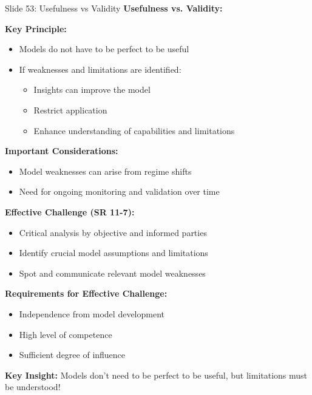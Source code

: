 \documentclass[8pt]{beamer}
\begin{document}
	\begin{frame}{Slide 53: Usefulness vs Validity}
		\fontsize{6.5}{7.5}\selectfont
		\textbf{Usefulness vs. Validity:}
		
		\vspace{0.1cm}
		\textbf{Key Principle:}
		\begin{itemize}
			\item Models do not have to be perfect to be useful
			\item If weaknesses and limitations are identified:
			\begin{itemize}
				\item Insights can improve the model
				\item Restrict application
				\item Enhance understanding of capabilities and limitations
			\end{itemize}
		\end{itemize}
		
		\vspace{0.1cm}
		\textbf{Important Considerations:}
		\begin{itemize}
			\item Model weaknesses can arise from regime shifts
			\item Need for ongoing monitoring and validation over time
		\end{itemize}
		
		\vspace{0.1cm}
		\textbf{Effective Challenge (SR 11-7):}
		\begin{itemize}
			\item Critical analysis by objective and informed parties
			\item Identify crucial model assumptions and limitations
			\item Spot and communicate relevant model weaknesses
		\end{itemize}
		
		\vspace{0.1cm}
		\textbf{Requirements for Effective Challenge:}
		\begin{itemize}
			\item Independence from model development
			\item High level of competence
			\item Sufficient degree of influence
		\end{itemize}
		
		\textcolor{myblue}{\textbf{Key Insight:}} Models don't need to be perfect to be \textcolor{myblue}{useful, but limitations must be understood}!
	\end{frame}
	
\end{document}
